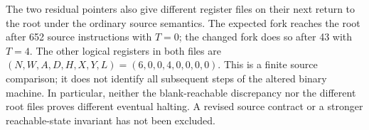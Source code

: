 The two residual pointers also give different register files on their next
return to the root under the ordinary source semantics. The expected fork
reaches the root after 652 source instructions with $T=0$; the changed fork
does so after 43 with $T=4$. The other logical registers in both files are
$(N,W,A,D,H,X,Y,L)=(6,0,0,4,0,0,0,0)$. This is a finite source comparison;
it does not identify all subsequent steps of the altered binary machine.
In particular, neither the blank-reachable discrepancy nor the different
root files proves different eventual halting. A revised source contract or
a stronger reachable-state invariant has not been excluded.
